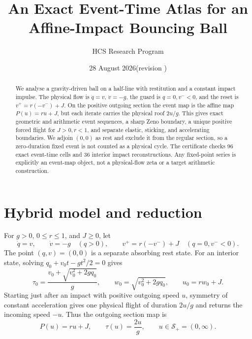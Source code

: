 \documentclass[11pt]{article}
\title{An Exact Event-Time Atlas for an Affine-Impact Bouncing Ball}
\author{HCS Research Program}
\date{28 August 2026\quad (revision \CRevisionRound)}
\newcommand{\Sreg}{\mathcal S_+}
\begin{document}
\maketitle
\begin{abstract}
We analyse a gravity-driven ball on a half-line with restitution and a constant
impact impulse.  The physical flow is $\dot q=v$, $\dot v=-g$, the guard is
$q=0,v^-<0$, and the reset is $v^+=r(-v^-)+J$.  On the positive outgoing
section the event map is the affine map $P(u)=ru+J$, but each iterate carries
the physical roof $2u/g$.  This gives exact geometric and arithmetic event
sequences, a sharp Zeno boundary, a unique positive forced flight for
$J>0,r<1$, and separate elastic, sticking, and accelerating boundaries.  We
adjoin $(0,0)$ as rest and exclude it from the regular section, so a
zero-duration fixed event is not counted as a physical cycle.  The certificate
checks 96 exact event-time cells and 36 interior impact reconstructions.  Any
fixed-point series is explicitly an event-map object, not a physical-flow
zeta or a target arithmetic construction.
\end{abstract}

\section{Hybrid model and reduction}
For $g>0$, $0\le r\le1$, and $J\ge0$, let
\[
 \dot q=v,\qquad \dot v=-g\quad(q>0),\qquad
 v^+=r(-v^-)+J\quad(q=0,v^-<0).
\]
The point $(q,v)=(0,0)$ is a separate absorbing rest state.  For an interior
state, solving $q_0+v_0t-gt^2/2=0$ gives
\[
 \tau_0=\frac{v_0+\sqrt{v_0^2+2gq_0}}{g},\qquad
 w_0=\sqrt{v_0^2+2gq_0},\qquad u_0=rw_0+J.
\]
Starting just after an impact with positive outgoing speed $u$, symmetry of
constant acceleration gives one physical flight of duration $2u/g$ and returns
the incoming speed $-u$.  Thus the outgoing section map is
\[
 P(u)=ru+J,\qquad \tau(u)=\frac{2u}{g},\qquad u\in\Sreg=(0,\infty).
\]
\end{document}
